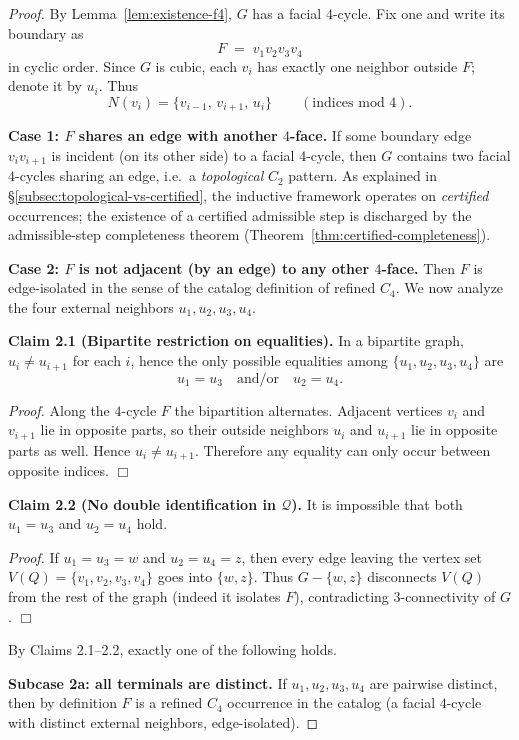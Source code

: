 \documentclass[12pt]{article}
\theoremstyle{definition}
\begin{document}
\begin{proof}
By Lemma~\ref{lem:existence-f4}, $G$ has a facial $4$-cycle. Fix one and write its boundary as
\[
F \;=\; v_1v_2v_3v_4
\]
in cyclic order.
Since $G$ is cubic, each $v_i$ has exactly one neighbor outside $F$; denote it by $u_i$.
Thus
\[
N(v_i)=\{v_{i-1},\,v_{i+1},\,u_i\}\qquad (\text{indices mod }4).
\]

\medskip
\noindent\textbf{Case 1: $F$ shares an edge with another $4$-face.}
If some boundary edge $v_iv_{i+1}$ is incident (on its other side) to a facial $4$-cycle,
then $G$ contains two facial $4$-cycles sharing an edge, i.e.\ a \emph{topological} $C_2$ pattern.
As explained in \S\ref{subsec:topological-vs-certified}, the inductive framework operates on \emph{certified} occurrences; the existence of a certified admissible step is discharged by the admissible-step completeness theorem (Theorem~\ref{thm:certified-completeness}).

\medskip
\noindent\textbf{Case 2: $F$ is not adjacent (by an edge) to any other $4$-face.}
Then $F$ is edge-isolated in the sense of the catalog definition of refined $C_4$.
We now analyze the four external neighbors $u_1,u_2,u_3,u_4$.

\medskip
\noindent\textbf{Claim 2.1 (Bipartite restriction on equalities).}
In a bipartite graph, $u_i\neq u_{i+1}$ for each $i$, hence the only possible equalities among
$\{u_1,u_2,u_3,u_4\}$ are
\[
u_1=u_3 \quad\text{and/or}\quad u_2=u_4.
\]

\smallskip
\noindent\emph{Proof.}
Along the $4$-cycle $F$ the bipartition alternates. Adjacent vertices $v_i$ and $v_{i+1}$
lie in opposite parts, so their outside neighbors $u_i$ and $u_{i+1}$ lie in opposite parts as well.
Hence $u_i\neq u_{i+1}$. Therefore any equality can only occur between opposite indices.
\hfill$\Box$

\medskip
\noindent\textbf{Claim 2.2 (No double identification in $\mathcal Q$).}
It is impossible that both $u_1=u_3$ and $u_2=u_4$ hold.

\smallskip
\noindent\emph{Proof.}
If $u_1=u_3=w$ and $u_2=u_4=z$, then every edge leaving the vertex set
$V(Q)=\{v_1,v_2,v_3,v_4\}$ goes into $\{w,z\}$.
Thus $G-\{w,z\}$ disconnects $V(Q)$ from the rest of the graph (indeed it isolates $F$),
contradicting $3$-connectivity of $G$.
\hfill$\Box$

\medskip
\noindent
By Claims 2.1--2.2, exactly one of the following holds.

\medskip
\noindent\textbf{Subcase 2a: all terminals are distinct.}
If $u_1,u_2,u_3,u_4$ are pairwise distinct, then by definition $F$ is a refined $C_4$
occurrence in the catalog (a facial $4$-cycle with distinct external neighbors, edge-isolated).


\end{proof}
\end{document}
